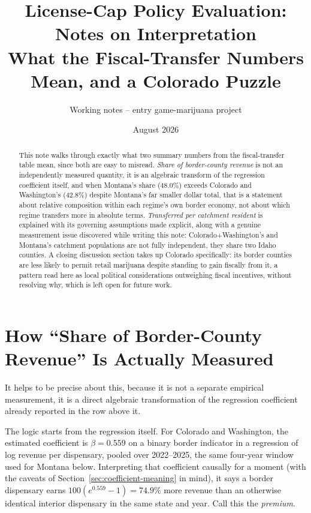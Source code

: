 \documentclass[11pt]{article}
\title{License-Cap Policy Evaluation: Notes on Interpretation\\
\large What the Fiscal-Transfer Numbers Mean, and a Colorado Puzzle}
\author{Working notes -- entry game-marijuana project}
\date{August 2026}
\begin{document}
\maketitle

\begin{abstract}
\noindent This note walks through exactly what two summary numbers from the fiscal-transfer table mean,
since both are easy to misread. \emph{Share of border-county revenue} is not an independently measured
quantity, it is an algebraic transform of the regression coefficient itself, and when Montana's share
(48.0\%) exceeds Colorado and Washington's (42.8\%) despite Montana's far smaller dollar total, that is a
statement about relative composition within each regime's own border economy, not about which regime
transfers more in absolute terms. \emph{Transferred per catchment resident} is explained with its
governing assumptions made explicit, along with a genuine measurement issue discovered while writing this
note: Colorado+Washington's and Montana's catchment populations are not fully independent, they share two
Idaho counties. A closing discussion section takes up Colorado specifically: its border counties are less
likely to permit retail marijuana despite standing to gain fiscally from it, a pattern read here as local
political considerations outweighing fiscal incentives, without resolving why, which is left open for
future work.
\end{abstract}



\section{How ``Share of Border-County Revenue'' Is Actually Measured}
\label{sec:share-measurement}

It helps to be precise about this, because it is not a separate empirical measurement, it is a direct
algebraic transformation of the regression coefficient already reported in the row above it.

The logic starts from the regression itself. For Colorado and Washington, the estimated coefficient is
$\beta=0.559$ on a binary border indicator in a regression of log revenue per dispensary, pooled over
2022--2025, the same four-year window used for Montana below. Interpreting that coefficient causally for
a moment (with the caveats of Section~\ref{sec:coefficient-meaning} in mind), it says a border dispensary
earns $100(e^{0.559}-1)=74.9\%$ more revenue than an otherwise identical interior dispensary in the same
state and year. Call this the \emph{premium}.
\end{document}
